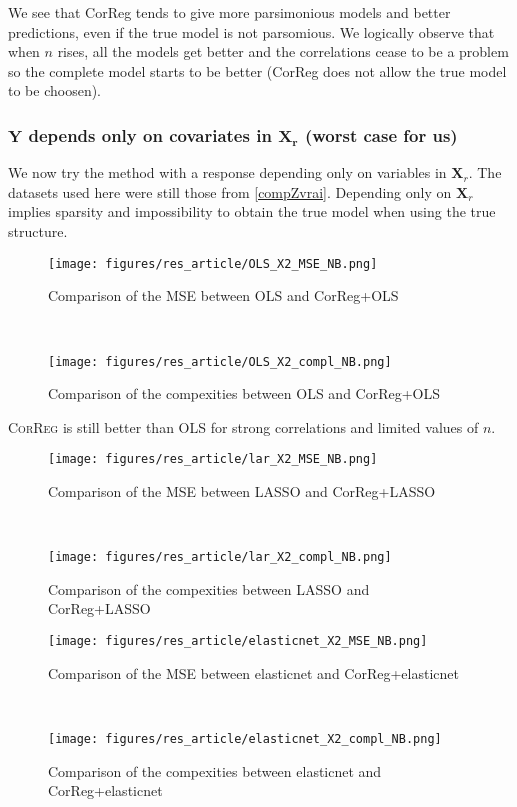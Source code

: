 \documentclass[12pt,a4paper]{report}
\begin{document}
We see that CorReg tends to give more parsimonious models and better predictions, even if the true model is not parsomious. We logically observe that when $n$ rises, all the models get better and the correlations cease to be a problem so the complete model starts to be better (CorReg does not allow the true model to be choosen).




\clearpage
	\subsubsection{$\boldsymbol{Y}$ depends only on covariates in $\boldsymbol{X_r}$ (worst case for us)}	 \label{tableMSEsimgauche}
We now try the method with a response depending only on variables in $\boldsymbol{X}_r$. The datasets used here were still those from \ref{compZvrai}.
Depending only on $\boldsymbol{X}_r$ implies sparsity and impossibility to obtain the true model when using the true structure. 

 \begin{figure}[h!]
	\begin{minipage}[l]{.48\linewidth}
			\texttt{[image: figures/res\_article/OLS\_X2\_MSE\_NB.png]} 
			\caption{Comparison of the MSE between OLS and CorReg+OLS}
	\end{minipage} \
   \begin{minipage}[r]{.48\linewidth}
			\texttt{[image: figures/res\_article/OLS\_X2\_compl\_NB.png]} 
			\caption{Comparison of the compexities between OLS and CorReg+OLS} 
   \end{minipage}
\end{figure}
\textsc{CorReg} is still better than OLS for strong correlations and limited values of $n$. 
 \begin{figure}[h!]
	\begin{minipage}[l]{.48\linewidth}
			\texttt{[image: figures/res\_article/lar\_X2\_MSE\_NB.png]} 
			\caption{Comparison of the MSE between LASSO and CorReg+LASSO}
	\end{minipage} \
   \begin{minipage}[r]{.48\linewidth}
			\texttt{[image: figures/res\_article/lar\_X2\_compl\_NB.png]} 
			\caption{Comparison of the compexities between LASSO and CorReg+LASSO} 
   \end{minipage}
\end{figure}

 \begin{figure}[h!]
	\begin{minipage}[l]{.48\linewidth}
			\texttt{[image: figures/res\_article/elasticnet\_X2\_MSE\_NB.png]} 
			\caption{Comparison of the MSE between elasticnet and CorReg+elasticnet}
	\end{minipage} \
   \begin{minipage}[r]{.48\linewidth}
			\texttt{[image: figures/res\_article/elasticnet\_X2\_compl\_NB.png]} 
			\caption{Comparison of the compexities between elasticnet and CorReg+elasticnet} 
   \end{minipage}
\end{figure}
\end{document}
